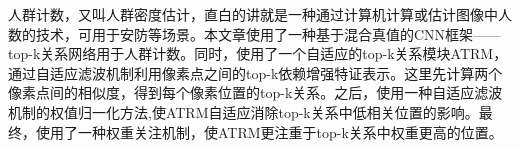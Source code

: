 


\begin{abstractcn}
    人群计数，又叫人群密度估计，直白的讲就是一种通过计算机计算或估计图像中人数的技术，可用于安防等场景。本文章使用了一种基于混合真值的CNN框架——top-k关系网络用于人群计数。同时，使用了一个自适应的top-k关系模块ATRM，通过自适应滤波机制利用像素点之间的top-k依赖增强特证表示。这里先计算两个像素点间的相似度，得到每个像素位置的top-k关系。之后，使用一种自适应滤波机制的权值归一化方法,使ATRM自适应消除top-k关系中低相关位置的影响。最终，使用了一种权重关注机制，使ATRM更注重于top-k关系中权重更高的位置。


\end{abstractcn}
